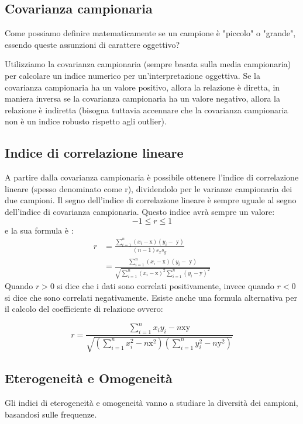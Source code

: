\subsection{Covarianza campionaria}
Come possiamo definire matematicamente se un campione è "piccolo" o "grande", essendo queste assunzioni di carattere oggettivo? 

Utilizziamo la covarianza campionaria (sempre basata sulla media campionaria) per calcolare un indice numerico per un'interpretazione oggettiva. Se la covarianza campionaria ha un valore positivo, allora la relazione è diretta, in maniera inversa se la covarianza campionaria ha un valore negativo, allora la relazione è indiretta (bisogna tuttavia accennare che la covarianza campionaria non è un indice robusto rispetto agli outlier).

\subsection{Indice di correlazione lineare}
A partire dalla covarianza campionaria è possibile ottenere l'indice di correlazione lineare (spesso denominato come r), dividendolo per le varianze campionaria dei due campioni. Il segno dell'indice di correlazione lineare è sempre uguale al segno dell'indice di covarianza campionaria. Questo indice avrà sempre un valore:
\begin{equation*}
		-1 \leq r \leq 1
	\end{equation*}
	e la sua formula è :
	\begin{align*}
	r & = \frac{	\sum_{i=1}^{n}	 (x_i - \text{\={x}}	)(y_i - \text{ \={y}}	)}{(n-1)s_xs_y}\\
		& = \frac{	\sum_{i=1}^{n} 	(x_i - \text{\={x}}	)(y_i - \text{ \={y}}	)}  {\sqrt{ \sum_{i=1}^n (x_i - \text{\={x}}	)^2 \sum_{i=1}^n (y_i - \text{\={y}})^2  }}
	\end{align*}
	Quando $r > 0$ si dice che i dati sono correlati positivamente, invece quando $r < 0$ si dice che sono correlati negativamente.
Esiste anche una formula alternativa per il calcolo del coefficiente di relazione ovvero: %

\begin{equation*}
r = \frac{	\sum_{i=1}^n x_iy_i - n \text{\={x}\={y}}}{\sqrt{(\sum_{i=1}^n x_i^2 - n\text{\={x}}^2)(\sum_{i=1}^n y_i^2 - n\text{\={y}}^2)}}
\end{equation*}

\subsection{Eterogeneità e Omogeneità}
Gli indici di eterogeneità e omogeneità vanno a studiare la diversità dei campioni, basandosi sulle frequenze.
